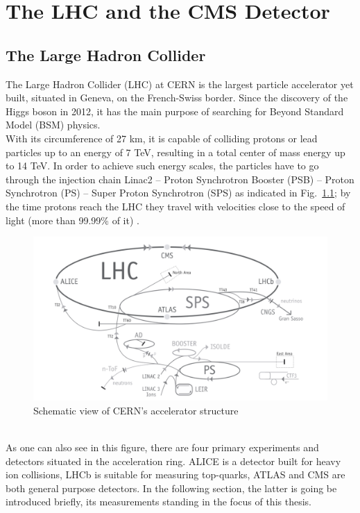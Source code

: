 \chapter{The LHC and the CMS Detector} %

\label{Chapter2} %

\section{The Large Hadron Collider}
The Large Hadron Collider (LHC) at CERN is the largest particle accelerator yet built, situated in Geneva, on the French-Swiss border. Since the discovery of the Higgs boson in 2012, it has the main purpose of searching for Beyond Standard Model (BSM) physics.\\
With its circumference of 27 km, it is capable of colliding protons or lead particles up to an energy of 7 TeV, resulting in a total center of mass energy up to 14 TeV. In order to achieve such energy scales, the particles have to go through the injection chain Linac2 -- Proton Synchrotron Booster (PSB) -- Proton Synchrotron (PS) -- Super Proton Synchrotron (SPS) as indicated in Fig.~\ref{fig:lhcstruct}; by the time protons reach the LHC they travel with velocities close to the speed of light (more than 99.99\% of it) \parencite{LHC_Machine}.\\
\begin{figure}[h]
	\centering
	\includegraphics[width=0.7\linewidth]{Figures/LHC_struct}
	\caption{Schematic view of CERN's accelerator structure \parencite{CERN-Guide}}
	\label{fig:lhcstruct}
\end{figure}\\
As one can also see in this figure, there are four primary experiments and detectors situated in the acceleration ring. ALICE is a detector built for heavy ion collisions, LHCb is suitable for measuring top-quarks, ATLAS and CMS are both general purpose detectors. In the following section, the latter is going be introduced briefly, its measurements standing in the focus of this thesis.
